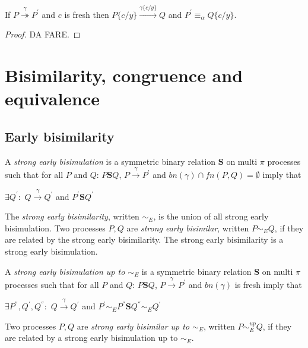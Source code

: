 \begin{lemma}\label{substitutionOverTransition}
  If $P \stackrel{\gamma}{\twoheadrightarrow} P^{'}$ and $c$ is fresh then $P\{c/y\} \xrightarrow{\gamma\{c/y\}} Q$ and $P^{'}\equiv_{\alpha}Q\{c/y\}$.
  \begin{proof}
    DA FARE.
  \end{proof}\end{lemma}


\section{Bisimilarity, congruence and equivalence}

\subsection{Early bisimilarity}

\begin{definition}\label{strongEarlyBisimulation}
  A \emph{strong early bisimulation} is a symmetric binary relation $\mathbf{S}$ on multi $\pi$ processes such that for all $P$ and $Q$: $P \mathbf{S} Q$, $P \xrightarrow{\gamma} P^{'}$ and $bn(\gamma)\cap fn(P,Q)=\emptyset$ imply that
  \begin{center}
    $\exists Q^{'}:$ $Q \xrightarrow{\gamma} Q^{'}$ and $P^{'}\mathbf{S} Q^{'}$
  \end{center}
  The \emph{strong early bisimilarity}, written $\sim_{E}$, is the union of all strong early bisimulation. Two processes $P,Q$ are \emph{strong early bisimilar}, written $P \sim_{E} Q$, if they are related by the strong early bisimilarity. The strong early bisimilarity is a strong early bisimulation.
\end{definition}

\begin{definition}\label{strongEarlyBisimulationUpTo}
  A \emph{strong early bisimulation up to $\sim_{E}$} is a symmetric binary relation $\mathbf{S}$ on multi $\pi$ processes such that for all $P$ and $Q$: $P \mathbf{S} Q$, $P \xrightarrow{\gamma} P^{'}$ and $bn(\gamma)$ is fresh imply that
  \begin{center}
    $\exists P^{''},Q^{'},Q^{''}:$ $Q \xrightarrow{\gamma} Q^{'}$ and $P^{'} \sim_{E} P^{''} \mathbf{S} Q^{''} \sim_{E} Q^{'} $
  \end{center}
  Two processes $P,Q$ are \emph{strong early bisimilar up to $\sim_{E}$}, written $P \sim_{E}^{up} Q$, if they are related by a strong early bisimulation up to $\sim_{E}$.
\end{definition}

